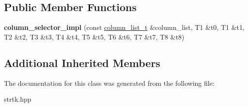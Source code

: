 \subsection*{Public Member Functions}
\begin{DoxyCompactItemize}
\item 
\hypertarget{classstrtk_1_1details_1_1column__selector__impl_3_01T0_00_01T1_00_01T2_00_01T3_00_01T4_00_01T5_00_01T6_00_01T7_00_01T8_01_4_ae146b8d110e2891e08401758b76db748}{{\bfseries column\-\_\-selector\-\_\-impl} (const \hyperlink{structstrtk_1_1details_1_1column__list__impl}{column\-\_\-list\-\_\-t} \&column\-\_\-list, T1 \&t0, T1 \&t1, T2 \&t2, T3 \&t3, T4 \&t4, T5 \&t5, T6 \&t6, T7 \&t7, T8 \&t8)}\label{classstrtk_1_1details_1_1column__selector__impl_3_01T0_00_01T1_00_01T2_00_01T3_00_01T4_00_01T5_00_01T6_00_01T7_00_01T8_01_4_ae146b8d110e2891e08401758b76db748}

\end{DoxyCompactItemize}
\subsection*{Additional Inherited Members}


The documentation for this class was generated from the following file\-:\begin{DoxyCompactItemize}
\item 
strtk.\-hpp\end{DoxyCompactItemize}
